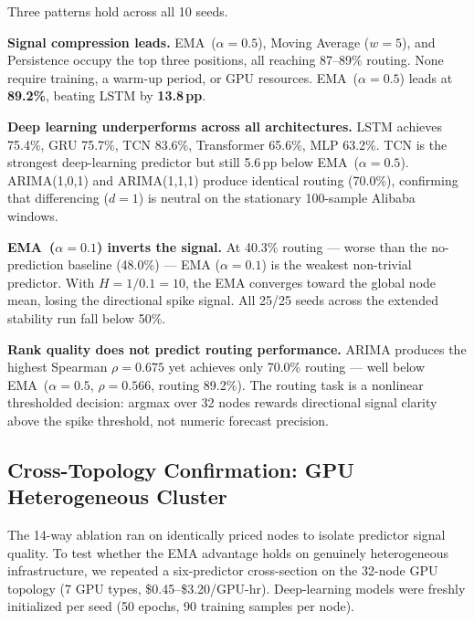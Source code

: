 \documentclass[conference]{IEEEtran}
\begin{document}
Three patterns hold across all 10 seeds.

\textbf{Signal compression leads.} EMA~($\alpha{=}0.5$), Moving Average
($w{=}5$), and Persistence occupy the top three positions, all reaching
87--89\% routing. None require training, a warm-up period, or GPU
resources. EMA~($\alpha{=}0.5$) leads at \textbf{89.2\%}, beating LSTM
by \textbf{13.8\,pp}.

\textbf{Deep learning underperforms across all architectures.}
LSTM achieves 75.4\%, GRU 75.7\%, TCN 83.6\%, Transformer 65.6\%,
MLP 63.2\%. TCN is the strongest deep-learning predictor but still
5.6\,pp below EMA~($\alpha{=}0.5$). ARIMA(1,0,1) and ARIMA(1,1,1) produce
identical routing (70.0\%), confirming that differencing ($d{=}1$) is
neutral on the stationary 100-sample Alibaba windows.

\textbf{EMA~($\alpha{=}0.1$) inverts the signal.} At 40.3\% routing ---
worse than the no-prediction baseline (48.0\%) --- EMA ($\alpha{=}0.1$)
is the weakest non-trivial predictor. With $H{=}1/0.1{=}10$, the EMA
converges toward the global node mean, losing the directional spike signal.
All 25/25 seeds across the extended stability run fall below 50\%.

\textbf{Rank quality does not predict routing performance.} ARIMA produces
the highest Spearman $\rho{=}0.675$ yet achieves only 70.0\% routing ---
well below EMA~($\alpha{=}0.5$, $\rho{=}0.566$, routing 89.2\%). The
routing task is a nonlinear thresholded decision: argmax over 32 nodes
rewards directional signal clarity above the spike threshold, not numeric
forecast precision.

\subsection{Cross-Topology Confirmation: GPU Heterogeneous Cluster}
\label{subsec:gpu_confirm}

The 14-way ablation ran on identically priced nodes to isolate predictor
signal quality. To test whether the EMA advantage holds on genuinely
heterogeneous infrastructure, we repeated a six-predictor cross-section
on the 32-node GPU topology (7 GPU types, \$0.45--\$3.20/GPU-hr).
Deep-learning models were freshly initialized per seed (50 epochs,
90 training samples per node).
\end{document}
